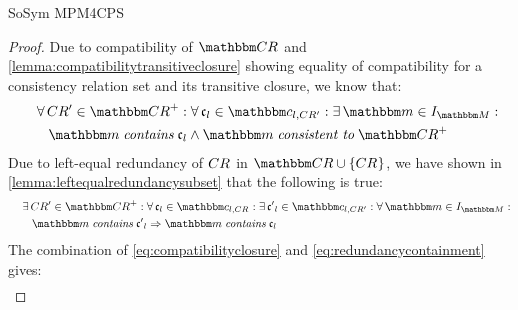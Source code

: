 \begin{copiedFrom}{SoSym MPM4CPS}
\begin{proof}
    Due to compatibility of $\consistencyrelationset{CR}$ and \autoref{lemma:compatibilitytransitiveclosure} showing equality of compatibility for a consistency relation set and its transitive closure, we know that:
    \begin{align} \label{eq:compatibilityclosure}
        \formulaskip & \nonumber
        \forall \consistencyrelation{CR'}{} \in \transitiveclosure{\consistencyrelationset{CR}} : \forall \conditionelement{c}{l} \in \condition{c}{l, \consistencyrelation{CR'}{}} %
        : \exists \modelset{m} \in \metamodelinstances{\metamodelset{M}} : \\
        & \formulaskip
        \modelset{m} \containsmath \conditionelement{c}{l} \land \modelset{m} \consistenttomath \transitiveclosure{\consistencyrelationset{CR}}
    \end{align}
    Due to left-equal redundancy of $CR_{}$ in $\consistencyrelationset{CR} \cup \setted{\consistencyrelation{CR}{}}$, we have shown in \autoref{lemma:leftequalredundancysubset} that the following is true:
    \begin{align} \label{eq:redundancycontainment}
        \formulaskip & \nonumber 
        \exists \consistencyrelation{CR'}{} \in \transitiveclosure{\consistencyrelationset{CR}} : \forall \conditionelement{c}{l} \in \condition{c}{l, \consistencyrelation{CR}{}} : \exists \conditionelement{c'}{l} \in \condition{c}{l,\consistencyrelation{CR'}{}} : \forall \modelset{m} \in \metamodelinstances{\metamodelset{M}} : \\
        & \formulaskip
        \modelset{m} \containsmath \conditionelement{c'}{l} \Rightarrow \modelset{m} \containsmath \conditionelement{c}{l}
    \end{align}
    The combination of \autoref{eq:compatibilityclosure} and \autoref{eq:redundancycontainment} gives:
    \begin{align*}

\end{align*}
\end{proof}
\end{copiedFrom}
